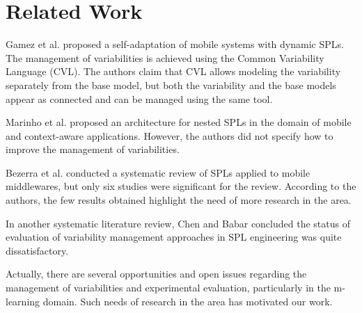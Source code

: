 \section{Related Work} \label{section6}


Gamez et al. \cite{gamez14} proposed a self-adaptation of mobile systems with dynamic SPLs. The management of variabilities is achieved using the Common Variability Language (CVL). The authors claim that CVL allows modeling the variability separately from the base model, but both the variability and the base models appear as connected and can be managed using the same tool. %

Marinho et al. \cite{marinho10} proposed an architecture for nested SPLs in the domain of mobile and context-aware applications. However, the authors did not specify how to improve the management of variabilities. %

Bezerra et al. \cite{bezerra09} conducted a systematic review of SPLs applied to mobile middlewares, but only six studies were significant for the review. According to the authors, the few results obtained highlight the need of more research in the area. %

In another systematic literature review, Chen and Babar \cite{chen11} concluded the status of evaluation of variability management approaches in SPL engineering was quite dissatisfactory.

Actually, there are several opportunities and open issues regarding the management of variabilities and experimental evaluation, particularly in the m-learning domain. Such needs of research in the area has motivated our work.

